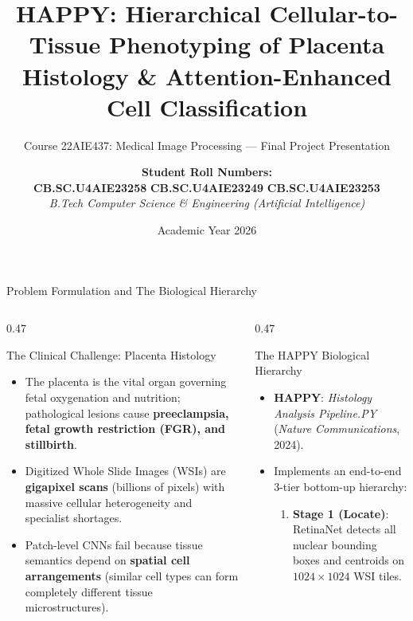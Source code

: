 \documentclass[aspectratio=169, 10pt]{beamer}
\title[HAPPY Placenta Histology Replication \& Novelty]{HAPPY: Hierarchical Cellular-to-Tissue Phenotyping of Placenta Histology \& Attention-Enhanced Cell Classification}
\subtitle{Course 22AIE437: Medical Image Processing --- Final Project Presentation}
\author[Course 22AIE437]{
  \textbf{Student Roll Numbers:} \\
  \vspace{0.15cm}
  \textbf{CB.SC.U4AIE23258} \quad \textbf{CB.SC.U4AIE23249} \quad \textbf{CB.SC.U4AIE23253} \\
  \vspace{0.25cm}
  \textit{B.Tech Computer Science \& Engineering (Artificial Intelligence)}
}
\institute[Amrita Vishwa Vidyapeetham]{
  Amrita School of Artificial Intelligence \\
  Amrita Vishwa Vidyapeetham, Coimbatore
}
\date{Academic Year 2026}
\begin{document}
\begin{frame}[plain]
  \titlepage
\end{frame}

\begin{frame}{Problem Formulation and The Biological Hierarchy}
\begin{columns}[onlytextwidth, t]
  \begin{column}{0.47\textwidth}
    \begin{block}{The Clinical Challenge: Placenta Histology}
      \parbox[t][4.9cm][t]{\linewidth}{
        \begin{itemize}\small
          \item The placenta is the vital organ governing fetal oxygenation and nutrition; pathological lesions cause \textbf{preeclampsia, fetal growth restriction (FGR), and stillbirth}.
          \item Digitized Whole Slide Images (WSIs) are \textbf{gigapixel scans} (billions of pixels) with massive cellular heterogeneity and specialist shortages.
          \item Patch-level CNNs fail because tissue semantics depend on \textbf{spatial cell arrangements} (similar cell types can form completely different tissue microstructures).
        \end{itemize}
      }
    \end{block}
  \end{column}
  \hfill
  \begin{column}{0.47\textwidth}
    \begin{block}{The HAPPY Biological Hierarchy}
      \parbox[t][4.9cm][t]{\linewidth}{
        \begin{itemize}\small
          \item \textbf{HAPPY}: \textit{Histology Analysis Pipeline.PY} (\textit{Nature Communications}, 2024).
          \item Implements an end-to-end 3-tier bottom-up hierarchy:
            \begin{enumerate}\footnotesize
              \item \textbf{Stage 1 (Locate)}: RetinaNet detects all nuclear bounding boxes and centroids on $1024\times 1024$ WSI tiles.

\end{enumerate}
\end{itemize}}
\end{block}
\end{column}
\end{columns}
\end{frame}
\end{document}
